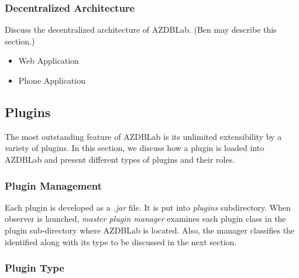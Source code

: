 \documentclass[conference]{IEEEtran}
\begin{document}
\subsubsection{Decentralized Architecture}
Discuss the decentralized architecture of {\sc AZDBLab}. 
(Ben may describe this section.)

\begin{itemize}

\item Web Application 

\item Phone Application
\end{itemize} 


\subsection{Plugins}
The most outstanding feature of {\sc AZDBLab} is its 
unlimited extensibility by a variety of plugins. 
In this section, we discuss how a plugin is loaded into {\sc AZDBLab} 
and present different types of plugins and their roles. 

\subsubsection{Plugin Management}

Each plugin is developed as a {\em .jar} file. 
It is put into {\em plugins} subdirectory. 
When observer is launched, {\em master plugin manager} 
examines each plugin class in the plugin sub-directory 
where {\sc AZDBLab} is located.  Also, 
the manager classifies the identified along with 
its type to be discussed in the next section. 

\subsubsection{Plugin Type}
\end{document}
